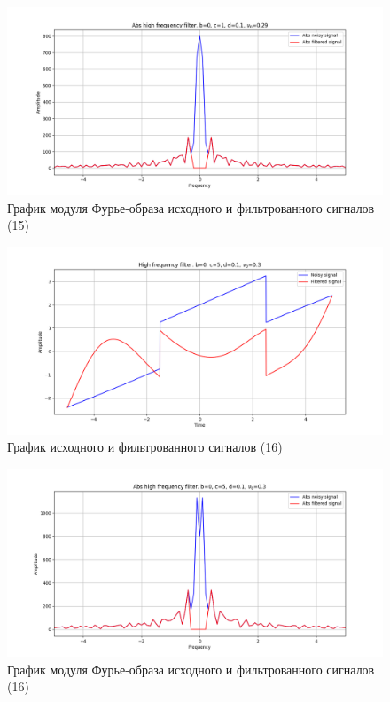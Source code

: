 \documentclass[a4paper, 12pt]{article}
\begin{document}
    \begin{figure}[!htb]
        \centering
        \includegraphics[scale=0.48]{15_abs_u_U_nolow.png}
        \captionsetup{skip=0pt}
        \caption{График модуля Фурье-образа исходного и фильтрованного сигналов (15)}
        \label{fig:fig56}
    \end{figure}
    \begin{figure}[!htb]
        \centering
        \includegraphics[scale=0.48]{16_u_flt_u_nolow.png}
        \captionsetup{skip=0pt}
        \caption{График исходного и фильтрованного сигналов (16)}
        \label{fig:fig57}
    \end{figure}
    \begin{figure}[!htb]
        \centering
        \includegraphics[scale=0.48]{16_abs_u_U_nolow.png}
        \captionsetup{skip=0pt}
        \caption{График модуля Фурье-образа исходного и фильтрованного сигналов (16)}
        \label{fig:fig58}
    \end{figure}
\end{document}
